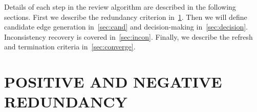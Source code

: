 Details of each step in the review algorithm are described in the following sections.
First we describe the redundancy criterion in~\cref{sec:redun}.
Then we will define candidate edge generation in~\cref{sec:cand} and decision-making in~\cref{sec:decision}.
Inconsistency recovery is covered in~\cref{sec:incon}.
Finally, we describe the refresh and termination criteria in~\cref{sec:converge}.


\FloatBarrier{}
\section{POSITIVE AND NEGATIVE REDUNDANCY}\label{sec:redun}

